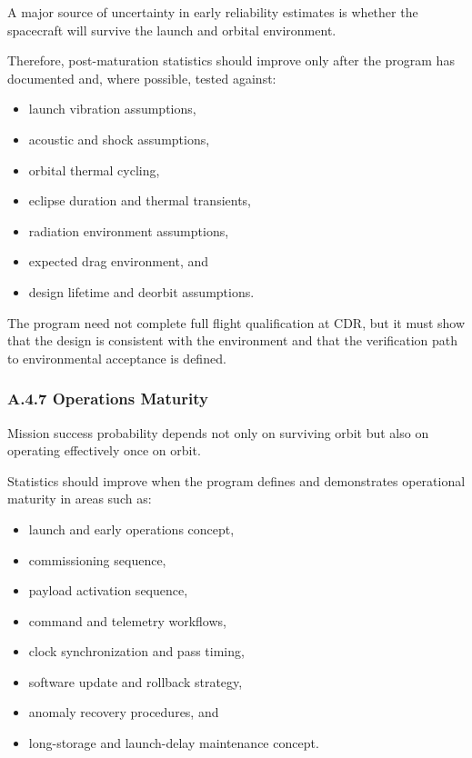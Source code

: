 \documentclass[11pt]{article}
\begin{document}
A major source of uncertainty in early reliability estimates is whether the spacecraft will survive the
launch and orbital environment.

Therefore, post-maturation statistics should improve only after the program has documented and,
where possible, tested against:

\begin{itemize}
    \item launch vibration assumptions,
    \item acoustic and shock assumptions,
    \item orbital thermal cycling,
    \item eclipse duration and thermal transients,
    \item radiation environment assumptions,
    \item expected drag environment, and
    \item design lifetime and deorbit assumptions.
\end{itemize}

The program need not complete full flight qualification at CDR, but it must show that the design is
consistent with the environment and that the verification path to environmental acceptance is defined.

\subsubsection*{A.4.7 Operations Maturity}

Mission success probability depends not only on surviving orbit but also on operating effectively
once on orbit.

Statistics should improve when the program defines and demonstrates operational maturity in areas
such as:

\begin{itemize}
    \item launch and early operations concept,
    \item commissioning sequence,
    \item payload activation sequence,
    \item command and telemetry workflows,
    \item clock synchronization and pass timing,
    \item software update and rollback strategy,
    \item anomaly recovery procedures, and
    \item long-storage and launch-delay maintenance concept.
\end{itemize}
\end{document}
